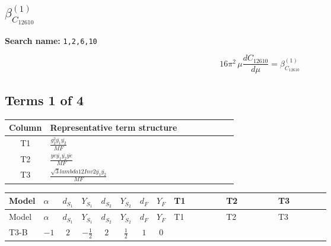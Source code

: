 \documentclass[8pt]{article}
\begin{document}
\begin{landscape}
\section*{$\beta_{C_{12610}}^{(1)}$}
\noindent\textbf{Search name: }\texttt{1,2,6,10}\par\smallskip
\[16\pi^2\,\mu\frac{d C_{12610}}{d\mu}=\beta_{C_{12610}}^{(1)}\]
\subsection*{Terms 1 of 4}
\begin{center}
\begin{tabular}{@{}c >{\raggedright\arraybackslash}p{0.82\linewidth}@{}}
\toprule
Column & Representative term structure \\
\midrule
T1 & \(\displaystyle \frac{g_{2}^{2} \overline{y_{1}} \overline{y_{2}}}{MF}\) \\
\midrule
T2 & \(\displaystyle \frac{ye \overline{y_{1}} \overline{y_{2}} \overline{ye}}{MF}\) \\
\midrule
T3 & \(\displaystyle \frac{\sqrt{3} lambda12Inv2 \overline{y_{1}} \overline{y_{2}}}{MF}\) \\
\midrule
\bottomrule
\end{tabular}
\end{center}
\smallskip
\tiny
\begin{longtable}{@{}llcccccc >{\raggedright\arraybackslash}p{0.21\linewidth} >{\raggedright\arraybackslash}p{0.21\linewidth} >{\raggedright\arraybackslash}p{0.21\linewidth}@{}}
\toprule
Model & $\alpha$ & $d_{S_1}$ & $Y_{S_1}$ & $d_{S_2}$ & $Y_{S_2}$ & $d_F$ & $Y_F$ & T1 & T2 & T3 \\
\midrule
\endfirsthead
\toprule
Model & $\alpha$ & $d_{S_1}$ & $Y_{S_1}$ & $d_{S_2}$ & $Y_{S_2}$ & $d_F$ & $Y_F$ & T1 & T2 & T3 \\
\midrule
\endhead
T3-B & $-1$ & $2$ & $-\frac{1}{2}$ & $2$ & $\frac{1}{2}$ & $1$ & $0$ & \scriptsize\adjustbox{max width=\linewidth}{$\begin{gathered} \frac{3 g_{2}^{2} \overline{y_{1}} \overline{y_{2}}}{8 MF}\end{gathered}$} & \scriptsize\adjustbox{max width=\linewidth}{$\begin{gathered} - \frac{ye \overline{y_{1}} \overline{y_{2}} \overline{ye}}{8 MF}\end{gathered}$} & \scriptsize\adjustbox{max width=\linewidth}{$\begin{gathered} \frac{\sqrt{3} lambda12Inv2 \overline{y_{1}} \overline{y_{2}}}{6 MF}\end{gathered}$} \\

\end{longtable}
\end{landscape}
\end{document}
